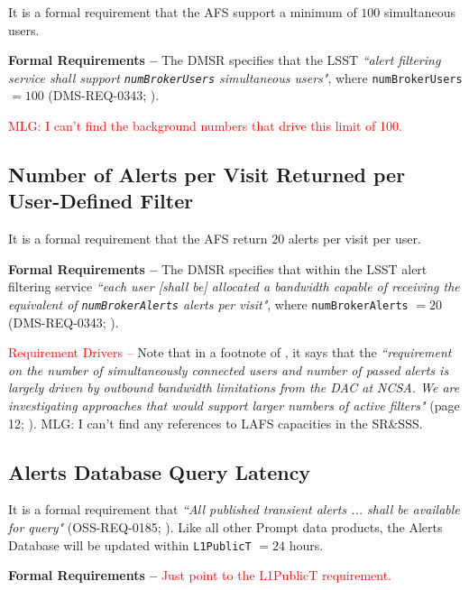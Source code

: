 \documentclass[DM,authoryear,toc]{lsstdoc}
\begin{document}
It is a formal requirement that the AFS support a minimum of $100$ simultaneous users.

{\bf Formal Requirements --} The DMSR specifies that the LSST {\it ``alert filtering service shall support {\tt numBrokerUsers} simultaneous users"}, where {\tt numBrokerUsers} $=100$ (DMS-REQ-0343; ).

\textcolor{red}{MLG: I can't find the background numbers that drive this limit of 100.}

\subsection{Number of Alerts per Visit Returned per User-Defined Filter}\label{ssec:AFS_returns}

It is a formal requirement that the AFS return $20$ alerts per visit per user.

{\bf Formal Requirements --} The DMSR specifies that within the LSST alert filtering service {\it ``each user [shall be] allocated a bandwidth capable of receiving the equivalent of {\tt numBrokerAlerts} alerts per visit"}, where {\tt numBrokerAlerts} $=20$ (DMS-REQ-0343; ).

\textcolor{red}{Requirement Drivers --} Note that in a footnote of , it says that the {\it ``requirement on the number of simultaneously connected users and number of passed alerts is largely driven by outbound bandwidth limitations from the DAC at NCSA. We are investigating approaches that would support larger numbers of active filters"} (page 12; ). MLG: I can't find any references to LAFS capacities in the SR\&SSS.

\subsection{Alerts Database Query Latency}

It is a formal requirement that {\it ``All published transient alerts ... shall be available for query"} (OSS-REQ-0185; ). Like all other Prompt data products, the Alerts Database will be updated within {\tt L1PublicT} $=24$ hours.

{\bf Formal Requirements --} \textcolor{red}{Just point to the L1PublicT requirement.}


\clearpage


\end{document}
